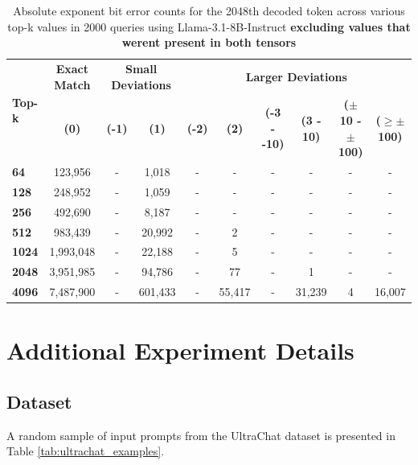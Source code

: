 \documentclass{article}
\theoremstyle{plain}
\theoremstyle{definition}
\theoremstyle{remark}
\begin{document}
\begin{table}[ht]
\caption{Absolute exponent bit error counts for the 2048th decoded token across various top-k values in 2000 queries using Llama-3.1-8B-Instruct \textbf{excluding values that werent present in both tensors}}
\label{tab:exponent_errors_appendix}
\vskip 0.15in
\begin{center}
\begin{small}
\begin{tabular}{@{}lccccccccc@{}}
 \toprule
\multirow{2}{*}{\textbf{Top-k}} & \multicolumn{1}{c}{\textbf{Exact Match}} & \multicolumn{2}{c}{\textbf{Small Deviations}} & \multicolumn{6}{c}{\textbf{Larger Deviations}} \\ 
\cmidrule(lr){2-2} \cmidrule(lr){3-4} \cmidrule(lr){5-10}
 & \textbf{(0)}  & \textbf{(-1)} & \textbf{(1)} & \textbf{(-2)} & \textbf{(2)} & \textbf{(-3 - -10)} & \textbf{(3 - 10)} & \textbf{($\pm$10 - $\pm$100)} & \textbf{($\geq\pm$100)} \\ \midrule
 \textbf{64} & 123,956 & - & 1,018 & - & - & - & - & - & - \\ 
\textbf{128} & 248,952 & - & 1,059 & - & - & - & - & - & - \\ 
\textbf{256} & 492,690 & - & 8,187 & - & - & - & - & - & - \\ 
\textbf{512} & 983,439 & - & 20,992 & - & 2 & - & - & - & - \\ 
\textbf{1024} & 1,993,048 & - & 22,188 & - & 5 & - & - & - & - \\ 
\textbf{2048} & 3,951,985 & - & 94,786 & - & 77 & - & 1 & - & - \\ 
\textbf{4096} & 7,487,900 & - & 601,433 & - & 55,417 & - & 31,239 & 4 & 16,007 \\ 
\bottomrule
\end{tabular}
\end{small}
\end{center}
\vskip -0.1in
\end{table}


\section{Additional Experiment Details}

\subsection{Dataset}

A random sample of input prompts from the UltraChat dataset is presented in Table \ref{tab:ultrachat_examples}.
\end{document}
